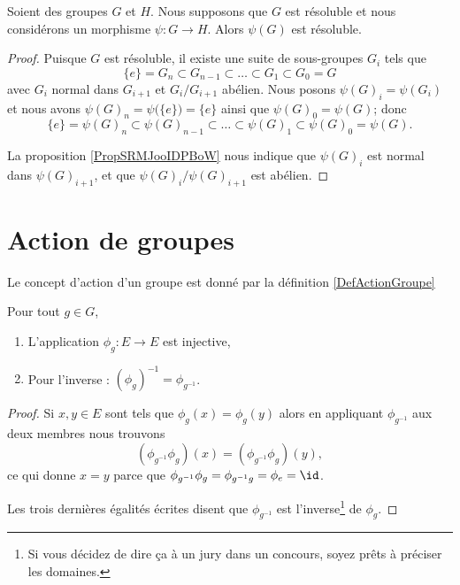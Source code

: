 \begin{proposition} \label{PropBNEZooJMDFIB}
	Soient des groupes \( G\) et \( H\). Nous supposons que \( G\) est résoluble et nous considérons un morphisme \( \psi\colon G\to H\). Alors \( \psi(G)\) est résoluble.
\end{proposition}

\begin{proof}
	Puisque \( G\) est résoluble, il existe une suite de sous-groupes \( G_i\) tels que
	\begin{equation}
		\{ e \}=G_n\subset G_{n-1}\subset\ldots\subset G_1\subset G_0=G
	\end{equation}
	avec \( G_i\) normal dans \( G_{i+1}\) et \( G_i/G_{i+1}\) abélien. Nous posons \( \psi(G)_i=\psi(G_i)\) et nous avons \( \psi(G)_n=\psi\big( \{ e \} \big)=\{ e \}\) ainsi que \( \psi(G)_0=\psi(G)\); donc
	\begin{equation}
		\{ e \}=\psi(G)_n\subset \psi(G)_{n-1}\subset\ldots\subset \psi(G)_1\subset \psi(G)_0=\psi(G).
	\end{equation}

	La proposition \ref{PropSRMJooIDPBoW} nous indique que \( \psi(G)_i\) est normal dans \( \psi(G)_{i+1}\), et que \( \psi(G)_i/\psi(G)_{i+1}\) est abélien.
\end{proof}

\section{Action de groupes}
Le concept d'action d'un groupe est donné par la définition \ref{DefActionGroupe}

\begin{lemma}
	Pour tout \( g\in G\),
	\begin{enumerate}
		\item
		      L'application \( \phi_g\colon E\to E\) est injective,
		\item
		      Pour l'inverse : \( (\phi_g)^{-1}=\phi_{g^{-1}}\).
	\end{enumerate}
\end{lemma}

\begin{proof}
	Si \( x,y\in E\) sont tels que \( \phi_g(x)=\phi_g(y)\) alors en appliquant \( \phi_{g^{-1}}\) aux deux membres nous trouvons
	\begin{equation}
		(\phi_{g^{-1}}\phi_g)(x)=(\phi_{g^{-1}}\phi_g)(y),
	\end{equation}
	ce qui donne \( x=y\) parce que \( \phi_{g^{-1}}\phi_g=\phi_{g^{-1}g}=\phi_e=\id\).

	Les trois dernières égalités écrites disent que \( \phi_{g^{-1}}\) est l'inverse\footnote{Si vous décidez de dire ça à un jury dans un concours, soyez prêts à préciser les domaines.} de \( \phi_g\).
\end{proof}

